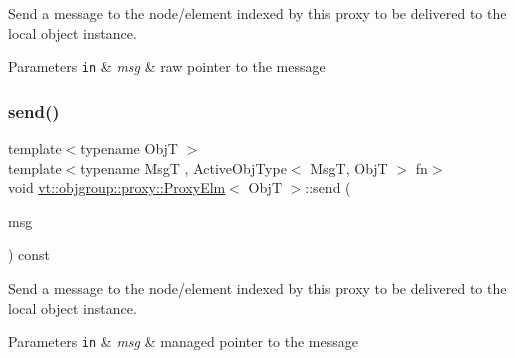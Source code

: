 Send a message to the node/element indexed by this proxy to be delivered to the local object instance. 


\begin{DoxyParams}[1]{Parameters}
\mbox{\tt in}  & {\em msg} & raw pointer to the message \\
\hline
\end{DoxyParams}
\mbox{\label{structvt_1_1objgroup_1_1proxy_1_1_proxy_elm_ab3d1751dac7c003cd13306277c164247}} 
\subsubsection{\texorpdfstring{send()}{send()}\hspace{0.1cm}{\footnotesize\ttfamily [2/3]}}
{\footnotesize\ttfamily template$<$typename ObjT $>$ \\
template$<$typename MsgT , Active\+Obj\+Type$<$ Msg\+T, Obj\+T $>$ fn$>$ \\
void \hyperlink{structvt_1_1objgroup_1_1proxy_1_1_proxy_elm}{vt\+::objgroup\+::proxy\+::\+Proxy\+Elm}$<$ ObjT $>$\+::send (\begin{DoxyParamCaption}\item[{\hyperlink{namespacevt_ab2b3d506ec8e8d1540aede826d84a239}{Msg\+Shared\+Ptr}$<$ MsgT $>$}]{msg }\end{DoxyParamCaption}) const}



Send a message to the node/element indexed by this proxy to be delivered to the local object instance. 


\begin{DoxyParams}[1]{Parameters}
\mbox{\tt in}  & {\em msg} & managed pointer to the message \\
\hline
\end{DoxyParams}
\mbox{\label{structvt_1_1objgroup_1_1proxy_1_1_proxy_elm_a00370ac0c4f3cf81b10685ea4963484d}} 
